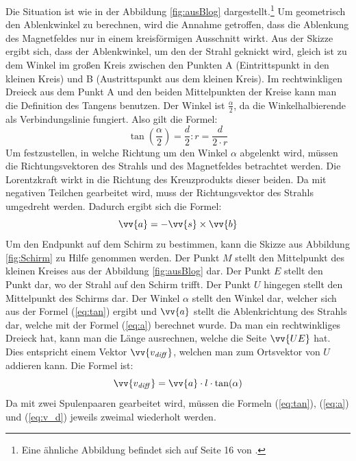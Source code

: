 Die Situation ist wie in der Abbildung \ref{fig:ausBlog} dargestellt.\footnote{Eine ähnliche Abbildung befindet sich auf Seite 16 von \cite{Gente1950}.}
Um geometrisch den Ablenkwinkel zu berechnen, wird die Annahme getroffen, dass die Ablenkung des Magnetfeldes nur in einem kreisförmigen Ausschnitt wirkt.
Aus der Skizze ergibt sich, dass der Ablenkwinkel, um den der Strahl geknickt wird, gleich ist zu dem Winkel im großen Kreis zwischen den Punkten A (Eintrittspunkt in den kleinen Kreis) und B (Austrittspunkt aus dem kleinen Kreis).
Im rechtwinkligen Dreieck aus dem Punkt A und den beiden Mittelpunkten der Kreise kann man die Definition des Tangens benutzen.
Der Winkel ist $\frac{\alpha}{2}$, da die Winkelhalbierende als Verbindungslinie fungiert.
Also gilt die Formel:
\begin{equation}
    \label{eq:tan}
    \tan \left(\frac{\alpha}{2}\right) = \frac{d}{2}:r = \frac{d}{2 \cdot r}
\end{equation}
Um festzustellen, in welche Richtung um den Winkel $\alpha$ abgelenkt wird, müssen die Richtungsvektoren des Strahls und des Magnetfeldes betrachtet werden.
Die Lorentzkraft wirkt in die Richtung des Kreuzprodukts dieser beiden.
Da mit negativen Teilchen gearbeitet wird, muss der Richtungsvektor des Strahls umgedreht werden. Dadurch ergibt sich die Formel: \begin{equation}
    \label{eq:a}
    \vv{a} = - \vv{s}\times \vv{b}
\end{equation}
Um den Endpunkt auf dem Schirm zu bestimmen, kann die Skizze aus Abbildung \ref{fig:Schirm} zu Hilfe genommen werden.
Der Punkt $M$ stellt den Mittelpunkt des kleinen Kreises aus der Abbildung \ref{fig:ausBlog} dar.
Der Punkt $E$ stellt den Punkt dar, wo der Strahl auf den Schirm trifft.
Der Punkt $U$ hingegen stellt den Mittelpunkt des Schirms dar.
Der Winkel $\alpha$ stellt den Winkel dar, welcher sich aus der Formel (\ref{eq:tan}) ergibt und $\vv{a}$ stellt die Ablenkrichtung des Strahls dar, welche mit der Formel (\ref{eq:a}) berechnet wurde.
Da man ein rechtwinkliges Dreieck hat, kann man die Länge ausrechnen, welche die Seite $\vv{UE}$ hat.
Dies entspricht einem Vektor $\vv{v_\mathit{diff}}$, welchen man zum Ortsvektor von $U$ addieren kann.
Die Formel ist:
\begin{equation}
    \label{eq:v_d}
    \vv{v_\mathit{diff}} =  \vv{a} \cdot l \cdot \tan(\alpha)
\end{equation}
Da mit zwei Spulenpaaren gearbeitet wird, müssen die Formeln (\ref{eq:tan}), (\ref{eq:a}) und (\ref{eq:v_d}) jeweils zweimal wiederholt werden.
